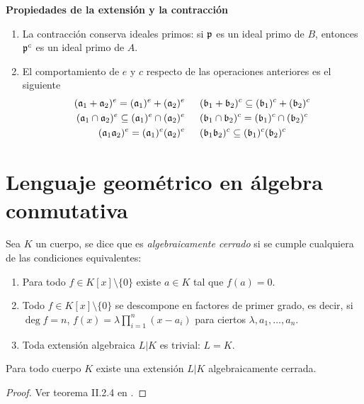 \documentclass[./main.tex]{subfiles}
\begin{document}
	\begin{remark} \textbf{Propiedades de la extensión y la contracción}
		
		\begin{enumerate}
			\item La contracción conserva ideales primos: si $\mathfrak{p}$ es un ideal primo de $B$, entonces $\mathfrak{p}^c$ es un ideal primo de $A$.
			\item El comportamiento de $e$ y $c$ respecto de las operaciones anteriores es el siguiente\begin{align*}
			(\mathfrak{a}_1+\mathfrak{a}_2)^e=(\mathfrak{a}_1)^e+(\mathfrak{a}_2)^e\hspace{15pt}& (\mathfrak{b}_1+\mathfrak{b}_2)^c\subseteq(\mathfrak{b}_1)^c+(\mathfrak{b}_2)^c\\
			(\mathfrak{a}_1\cap\mathfrak{a}_2)^e\subseteq(\mathfrak{a}_1)^e\cap(\mathfrak{a}_2)^e\hspace{15pt}&(\mathfrak{b}_1\cap\mathfrak{b}_2)^c=(\mathfrak{b}_1)^c\cap(\mathfrak{b}_2)^c\\
			(\mathfrak{a}_1\mathfrak{a}_2)^e=(\mathfrak{a}_1)^e(\mathfrak{a}_2)^e\hspace{15pt}& (\mathfrak{b}_1\mathfrak{b}_2)^c\subseteq(\mathfrak{b}_1)^c(\mathfrak{b}_2)^c
			\end{align*}
		\end{enumerate}
	\end{remark}
	
	
	\section{Lenguaje geométrico en álgebra conmutativa}
	
	\begin{definition}
		Sea $K$ un cuerpo, se dice que es \emph{algebraicamente cerrado} si se cumple cualquiera de las condiciones equivalentes:
		\begin{enumerate}
			\item Para todo $f\in K[x]\setminus\{0\}$ existe $a\in K$ tal que $f(a)=0$.
			\item Todo $f\in K[x]\setminus\{0\}$ se descompone en factores de primer grado, es decir, si $\deg f = n$, $f(x) =\lambda \prod_{i=1}^n (x-a_i)$ para ciertos $\lambda, a_1, \dots, a_n$.
			\item Toda extensión algebraica $L\vert K$ es trivial: $L = K$.
		\end{enumerate}
	\end{definition}
	
	\begin{proposition}
		Para todo cuerpo $K$ existe una extensión $L|K$ algebraicamente cerrada.
	\end{proposition}
	\begin{proof}
		Ver teorema II.2.4 en \cite{gamboa}.
	\end{proof}
	
\end{document}

